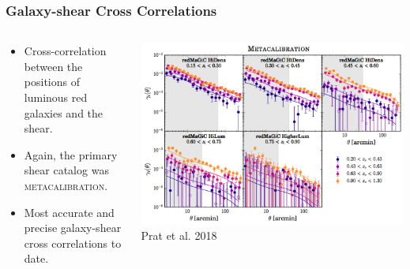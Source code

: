 \documentclass[aspectratio=169]{beamer}
\newcommand{\mcal}{\textsc{metacalibration}}
\begin{document}
\frame
{

    \frametitle{Galaxy-shear Cross Correlations}


    \begin{columns}
        \begin{column}{0.5\textwidth}
            \begin{itemize}

                \item Cross-correlation between the positions
                    of luminous red galaxies and the shear.

                \item Again, the primary shear catalog was \mcal.

                \item Most accurate and precise galaxy-shear cross
                    correlations to date.

            \end{itemize}

        \end{column}
        \begin{column}{0.5\textwidth}
            \centering
                \includegraphics[width=\linewidth]{ggl-fig2a.png}
                \newline
                {\tiny Prat et al. 2018}
        \end{column}

    \end{columns}

}
\end{document}
